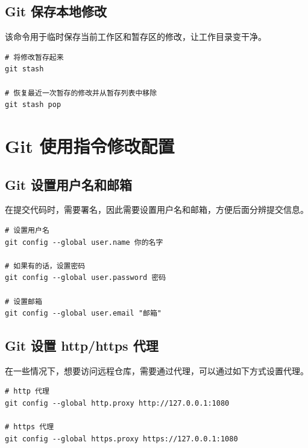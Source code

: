 \documentclass[UTF8]{gyh}
\begin{document}
    \subsection{Git 保存本地修改}
    该命令用于临时保存当前工作区和暂存区的修改，让工作目录变干净。
    \begin{lstlisting}
# 将修改暂存起来
git stash

# 恢复最近一次暂存的修改并从暂存列表中移除
git stash pop
    \end{lstlisting}

    \section{Git 使用指令修改配置}

    \subsection{Git 设置用户名和邮箱}
    在提交代码时，需要署名，因此需要设置用户名和邮箱，方便后面分辨提交信息。
    \begin{lstlisting}
# 设置用户名
git config --global user.name 你的名字

# 如果有的话，设置密码
git config --global user.password 密码

# 设置邮箱
git config --global user.email "邮箱"
    \end{lstlisting}

    \subsection{Git 设置 http/https 代理}
    在一些情况下，想要访问远程仓库，需要通过代理，可以通过如下方式设置代理。
    \begin{lstlisting}
# http 代理
git config --global http.proxy http://127.0.0.1:1080

# https 代理
git config --global https.proxy https://127.0.0.1:1080
    \end{lstlisting}
\end{document}
